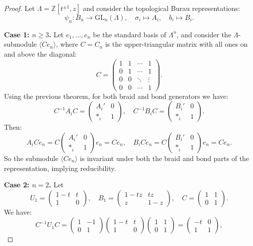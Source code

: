 \documentclass{article}
\theoremstyle{definition}
\theoremstyle{plain}
\theoremstyle{remark}
\begin{document}
\begin{proof}
Let $\Lambda = \mathbb{Z}[t^{\pm 1}, z]$ and consider the topological Burau representations:
$$
\psi_n: B_n \longrightarrow \mathrm{GL}_n(\Lambda), \quad \sigma_i \mapsto A_i, \quad b_i \mapsto B_i.
$$

\noindent \textbf{Case 1: $n \geq 3$.} Let $e_1, \dots, e_n$ be the standard basis of $\Lambda^n$, and consider the $\Lambda$-submodule $\langle C e_n \rangle$, where $C = C_n$ is the upper-triangular matrix with all ones on and above the diagonal:
$$
C =
\begin{pmatrix}
1 & 1 & \cdots & 1 \\
0 & 1 & \cdots & 1 \\
0 & 0 & \ddots & \vdots \\
0 & 0 & \cdots & 1
\end{pmatrix}.
$$
Using the previous theorem, for both braid and bond generators we have:
$$
C^{-1} A_i C = \begin{pmatrix} A_i' & 0 \\ \ast_i & 1 \end{pmatrix}, \quad
C^{-1} B_i C = \begin{pmatrix} B_i' & 0 \\ \ast_i & 1 \end{pmatrix}.
$$
Then:
$$
A_i C e_n = C \begin{pmatrix} A_i' & 0 \\ \ast_i & 1 \end{pmatrix} e_n = C e_n,
\quad
B_i C e_n = C \begin{pmatrix} B_i' & 0 \\ \ast_i & 1 \end{pmatrix} e_n = C e_n.
$$
So the submodule $\langle C e_n \rangle$ is invariant under both the braid and bond parts of the representation, implying reducibility.

\medskip

\noindent\textbf{Case 2: $n = 2$.} 
Let
$$
U_1 = \begin{pmatrix} 1 - t & t \\ 1 & 0 \end{pmatrix}, \quad
B_1 = \begin{pmatrix} 1 - tz & tz \\ z & 1 - z \end{pmatrix}, \quad
C = \begin{pmatrix} 1 & 1 \\ 0 & 1 \end{pmatrix}.
$$
We have:
$$
C^{-1} U_1 C = \begin{pmatrix} 1 & -1 \\ 0 & 1 \end{pmatrix}
\begin{pmatrix} 1 - t & t \\ 1 & 0 \end{pmatrix}
\begin{pmatrix} 1 & 1 \\ 0 & 1 \end{pmatrix}
= \begin{pmatrix} -t & 0 \\ 1 & 1 \end{pmatrix},
$$


\end{proof}
\end{document}
